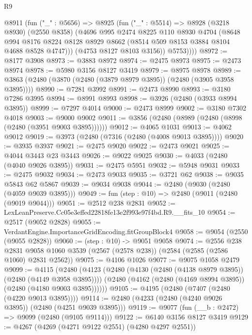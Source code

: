 \begin{lexlean}{R9}
\begin{coremodule}
        @8911
          (fun ("_" : @5656) =>
          @8925
            (fun ("_" : @5514) =>
            @8928
              (@3218 @8930)
              (@2550 @8358)
              (@4696
                @995
                @2474
                @8225
                @110
                @8930
                @4704
                (@8648
                  @994
                  @8176
                  @8224
                  @8128
                  @8929
                  @8662
                  (@8514 @509 @8153 @3884 @8104 @4688 @8528 @4747)))
              (@4753 @8127 @8103 @3156))
            @5753))))
@8972 := @8177 @3908
@8973 := @3883 @8972
@8974 := @2475 @8973
@8975 := @2473 @8974
@8978 := @5980 @3156 @8127 @3419
@8979 := @8975 @8978
@8989 := @3863 (@2480 (@3870 (@2480 (@3879 @8979 @3895)) (@2480 (@3905 @3958 @3895))))
@8990 := @7281 @3992
@8991 := @2473 @8990
@8993 := @3180 @7286 @3995
@8994 := @8991 @8993
@8998 := @3926 (@2480 (@3933 @8994 @3895))
@8999 := @7297 @4014
@9000 := @2473 @8999
@9002 := @3180 @7302 @4018
@9003 := @9000 @9002
@9011 := @3856 (@2480 (@8989 (@2480 (@8998 (@2480 (@3951 @9003 @3895))))))
@9012 := @4065 @1031
@9013 := @4062 @9012
@9019 := @3973 (@2480 (@7316 (@2480 (@4008 @9013 @3895))))
@9020 := @3935 @3937
@9021 := @2475 @9020
@9022 := @2473 @9021
@9025 := @4044 @3443 @23 @3443
@9026 := @9022 @9025
@9030 := @4033 (@2480 (@4040 @9026 @3895))
@9031 := @2475 @5951
@9032 := @5948 @9031
@9033 := @2475 @9032
@9034 := @2473 @9033
@9035 := @3721 @62
@9038 := @9035 @5843 @62 @5867
@9039 := @9034 @9038
@9044 := @2480 (@9030 (@2480 (@4059 @9039 @3895)))
@9049 := fun (step : @10) => @2480 (@9011 (@2480 (@9019 @9044)))
@9051 := @2512 @238 @2831
@9052 := LexLeanPreserve.Cc05e3effed22818fe13e2f993e97f4bd.R9.__fits_10
@9054 := @2517 (@9052 @2828)
@9055 := VerdantEngine.ImportanceGridEncoding.fitGroupBlock4
@9058 := @9054 (@2550 (@9055 @2828))
@9060 := (step : @10) -> @9051 @9058
@9074 := @2556
    @238
    @2831
    @9058
    @1060
    @3539
    (@2567 (@2578 @238))
    (@2584 (@2585 (@2586 @1060) @2831 @2562))
@9075 := @4106 @1026
@9077 := @9075 @1058 @2479
@9099 := @4115
    (@2480
      (@4123
        (@2480 (@4130 (@2480 (@4138 @8979 @3895)) (@2480 (@4149 @3958 @3895))))
        (@2480 (@4162 (@2480 (@4169 @8994 @3895)) (@2480 (@4180 @9003 @3895))))))
@9105 := @4195 (@2480 (@7407 (@2480 (@4220 @9013 @3895))))
@9114 := @2480 (@4233 (@2480 (@4240 @9026 @3895)) (@2480 (@4251 @9039 @3895)))
@9119 := @9077 (fun (__b : @2472) => @9099 (@2480 (@9105 @9114)))
@9122 := @6140 @3156 @8127 @3419
@9129 := @4267 (@4269 (@4271 @9122 @2551) (@4280 @4297 @2551))

\end{coremodule}
\end{lexlean}
